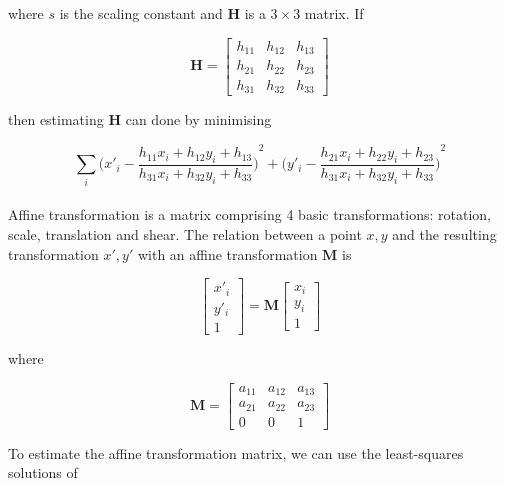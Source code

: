 \documentclass[12pt,oneside]{report}
\begin{document}
where $s$ is the scaling constant and $\textbf{H}$ is a $3 \times 3$ matrix. If

\begin{equation}
    \textbf{H}
    =
    \begin{bmatrix}
    h_{11} & h_{12} & h_{13} \\ h_{21} & h_{22} & h_{23} \\h_{31} & h_{32} & h_{33}
    \end{bmatrix}
\end{equation}

then estimating $\textbf{H}$ can done by minimising

\begin{equation}
    \sum_i
    {\biggl(x'_i - \frac{h_{11}x_i + h_{12}y_i + h_{13}}{h_{31}x_i + h_{32}y_i + h_{33}}\biggl)}^2
    +
    {\biggl(y'_i - \frac{h_{21}x_i + h_{22}y_i + h_{23}}{h_{31}x_i + h_{32}y_i + h_{33}}\biggl)}^2
\end{equation}


\paragraph{}
Affine transformation is a matrix comprising 4 basic transformations: rotation, scale, translation and shear. The relation between a point $x, y$ and the resulting transformation $x', y'$ with an affine transformation $\textbf{M}$ is

\begin{equation}
    \begin{bmatrix}
    x'_i \\ y'_i \\ 1
    \end{bmatrix}
    =
    \textbf{M}
    \begin{bmatrix}
    x_i \\ y_i \\ 1
    \end{bmatrix}
\end{equation}

where

\begin{equation}
    \textbf{M}
    =
    \begin{bmatrix}
    a_{11} & a_{12} & a_{13} \\ a_{21} & a_{22} & a_{23} \\ 0 & 0 & 1
    \end{bmatrix}
\end{equation}

To estimate the affine transformation matrix, we can use the least-squares solutions of
\end{document}
